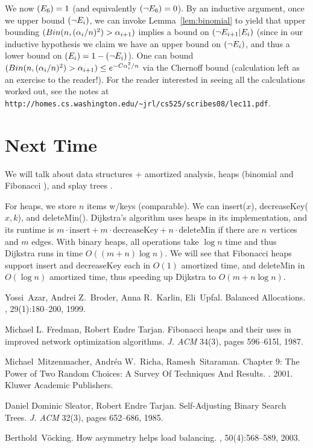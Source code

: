 \documentclass[11pt]{article}
\let\Pr\relax
\DeclareMathOperator*{\Pr}{\mathbb{P}}
\begin{document}
We now $\Pr(E_6) = 1$ (and equivalently $\Pr(\neg E_6) = 0$). By an inductive argument, once we upper bound $\Pr(\neg E_i)$, we can invoke Lemma~\ref{lem:binomial} to yield that upper bounding $\Pr(Bin(n, (\alpha_i/n)^2) > \alpha_{i+1})$ implies a bound on $\Pr(\neg E_{i+1} | E_i)$ (since in our inductive hypothesis we claim we have an upper bound on $\Pr(\neg E_i)$, and thus a lower bound on $\Pr(E_i) = 1 - \Pr(\neg E_i)$). One can bound $\Pr(Bin(n, (\alpha_i/n)^2) > \alpha_{i+1}) \le e^{-C\alpha_i^2 / n}$ via the Chernoff bound (calculation left as an exercise to the reader!). For the reader interested in seeing all the calculations worked out, see the notes at \texttt{http://homes.cs.washington.edu/{\textasciitilde}jrl/cs525/scribes08/lec11.pdf}.

\section{Next Time}

We will talk about data structures + amortized analysis, heaps (binomial and Fibonacci \cite{FT87}), and splay
trees \cite{ST85}.

For heaps, we store $n$ items w/keys (comparable). We can insert($x$), decreaseKey($x, k$),
and deleteMin(). Dijkstra's algorithm uses heaps in its implementation, and its runtime is
$m \cdot \text{insert} + m \cdot \text{decreaseKey} + n \cdot \text{deleteMin}$ if there are $n$
vertices and $m$ edges. With binary heaps, all operations take $\log n$ time and thus Dijkstra runs in time $O((m+n)\log n)$. We will see that Fibonacci heaps support insert and decreaseKey each in $O(1)$ amortized time, and deleteMin in $O(\log n)$ amortized time, thus speeding up Dijkstra to $O(m + n\log n)$.




\begin{thebibliography}{42}

Yossi~Azar, Andrei Z.~Broder, Anna R.~Karlin, Eli~Upfal.
\newblock Balanced Allocations.
, 29(1):180--200, 1999.

Michael L. Fredman, Robert Endre Tarjan.
Fibonacci heaps and their uses in improved network optimization algorithms.
{\em J. ACM} 34(3), pages 596--615l, 1987.

Michael~Mitzenmacher, Andr\'{e}a W.~Richa, Ramesh~Sitaraman.
\newblock Chapter 9: The Power of Two Random Choices:
A Survey Of Techniques And Results.
. 2001. Kluwer Academic Publishers.

Daniel Dominic Sleator, Robert Endre Tarjan.
Self-Adjusting Binary Search Trees. 
{\em J. ACM} 32(3), pages 652--686, 1985.

Berthold~V\"ocking.
\newblock How asymmetry helps load balancing.
, 50(4):568--589, 2003.

\end{thebibliography}
\end{document}
